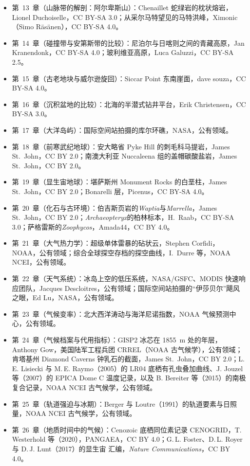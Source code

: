 \begin{itemize}
  \item 第~13~章（山脉带的解剖：阿尔卑斯山）：Chenaillet 蛇绿岩的枕状熔岩，Lionel Duchoiselle，CC BY-SA 3.0；从采尔马特望见的马特洪峰，Ximonic（Simo Räsänen），CC BY-SA 4.0。
  \item 第~14~章（碰撞带与安第斯带的比较）：尼泊尔与日喀则之间的青藏高原，Jan Kranendonk，CC BY-SA 4.0；玻利维亚高原，Luca Galuzzi，CC BY-SA 2.5。
  \item 第~15~章（古老地块与威尔逊旋回）：Siccar Point 东南崖面，dave souza，CC BY-SA 4.0。
  \item 第~16~章（沉积盆地的比较）：北海的半潜式钻井平台，Erik Christensen，CC BY-SA 3.0。
  \item 第~17~章（大洋岛屿）：国际空间站拍摄的库尔环礁，NASA，公有领域。
  \item 第~18~章（前寒武纪地球）：安大略省 Pyke Hill 的刺毛科马提岩，James St.~John，CC BY 2.0；南澳大利亚 Nuccaleena 组的盖帽碳酸盐岩，James St.~John，CC BY 2.0。
  \item 第~19~章（显生宙地球）：堪萨斯州 Monument Rocks 的白垩柱，James St.~John，CC BY 2.0；Bonarelli 层，Picenus，CC BY-SA 4.0。
  \item 第~20~章（化石与古环境）：伯吉斯页岩的\emph{Waptia}与\emph{Marrella}，James St.~John，CC BY 2.0；\emph{Archaeopteryx}的柏林标本，H.~Raab，CC BY-SA 3.0；萨格雷斯的\emph{Zoophycos}，Amada44，CC BY 4.0。
  \item 第~21~章（大气热力学）：超级单体雷暴的砧状云，Stephen Corfidi，NOAA，公有领域；综合全球探空存档的探空曲线，I.~Durre 等，NOAA NCEI，公有领域。
  \item 第~22~章（天气系统）：冰岛上空的低压系统，NASA/GSFC、MODIS 快速响应团队，Jacques Descloitres，公有领域；国际空间站拍摄的“伊莎贝尔”飓风之眼，Ed Lu，NASA，公有领域。
  \item 第~23~章（气候变率）：北大西洋涛动与海洋尼诺指数，NOAA 气候预测中心，公有领域。
  \item 第~24~章（气候档案与代用指标）：GISP2 冰芯在 1855~m 处的年层，Anthony Gow，美国陆军工程兵团 CRREL（NOAA 古气候学），公有领域；肯塔基州 Diamond Caverns 钟乳石的截面，James St.~John，CC BY 2.0；L.\,E. Lisiecki 与 M.\,E. Raymo（2005）的 LR04 底栖有孔虫叠加曲线、J. Jouzel 等（2007）的 EPICA Dome C 温度记录，以及 B. Bereiter 等（2015）的南极  复合记录，NOAA NCEI 古气候学，公有领域。
  \item 第~25~章（轨道强迫与冰期）：Berger 与 Loutre（1991）的轨道要素与日照量，NOAA NCEI 古气候学，公有领域。
  \item 第~26~章（地质时间中的气候）：Cenozoic 底栖同位素记录 CENOGRID，T. Westerhold 等（2020），PANGAEA，CC BY 4.0；G.\,L. Foster、D.\,L. Royer 与 D.\,J. Lunt（2017）的显生宙  汇编，\emph{Nature Communications}，CC BY 4.0。

\end{itemize}
